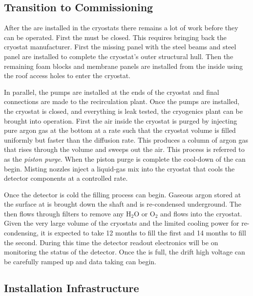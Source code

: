 \subsection{Transition to Commissioning}
\label{sec:fdsp-tc-inst-commiss}

After the  are installed in the cryostats there remains a lot
of work before they can be operated. First the 
must be closed. This requires bringing back the cryostat manufacturer. 
First the missing panel with the steel beams
and steel panel are installed to complete the cryostat's outer
structural hull. Then the remaining foam blocks and membrane panels
are installed from the inside using the roof access holes 
to enter the cryostat. 

In parallel, the \lar pumps are installed at
the ends of the cryostat and final connections are made to the
recirculation plant. Once the pumps are installed, the cryostat is
closed, and everything is leak tested, the cryogenics plant can be
brought into operation. First the air inside the cryostat is purged by
injecting pure argon gas at the bottom %
at a rate such
that the %
cryostat volume is filled uniformly but faster than the diffusion
rate. This produces a column of argon gas that rises through the volume %
and sweeps out the air. This process is referred to as the \textit{piston
purge}. When the piston purge is complete the cool-down of the 
can begin. Misting nozzles inject a liquid-gas mix into the cryostat
that cools the detector components at a controlled rate. 

Once the detector is
cold the filling process can begin. Gaseous argon stored at the surface 
at \surf is brought down the shaft and is re-condensed underground. The \lar then flows through filters to remove any H$_2$O or O$_2$ and
flows into the cryostat. Given the very large volume of the cryostats
and the limited cooling power for re-condensing, it is  %
expected to take \num{12} months to fill the first  and \num{14} months to
fill the second. During this time the detector readout electronics
will be on monitoring the status of the detector. %
Once the
 is full, the drift high voltage can be carefully ramped up and
data taking can begin.

\subsection{Installation Infrastructure}

